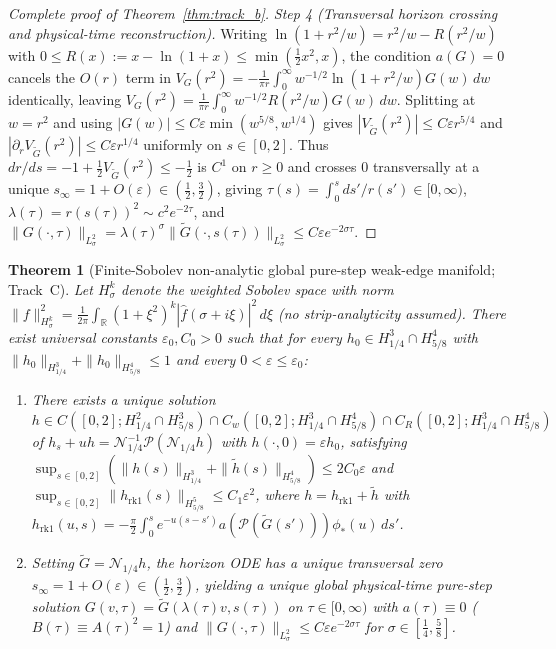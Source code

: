 \documentclass[11pt,a4paper]{article}
\newtheorem{thm}{Theorem}
\begin{document}
\begin{proof}[Complete proof of Theorem~\ref{thm:track_b}]
\emph{Step 4 (Transversal horizon crossing and physical-time reconstruction).}
Writing $\ln(1+r^2/w)=r^2/w-R(r^2/w)$ with $0\le R(x):=x-\ln(1+x)\le\min(\tfrac12 x^2,x)$, the condition $a(G)=0$ cancels the $O(r)$ term in $V_G(r^2)=-\frac{1}{\pi r}\int_0^\infty w^{-1/2}\ln(1+r^2/w)G(w)\,dw$ identically, leaving $V_G(r^2)=\frac{1}{\pi r}\int_0^\infty w^{-1/2}R(r^2/w)G(w)\,dw$.  Splitting at $w=r^2$ and using $|G(w)|\le C\varepsilon\min(w^{5/8},w^{1/4})$ gives $|V_{\widetilde G}(r^2)|\le C\varepsilon r^{5/4}$ and $|\partial_r V_{\widetilde G}(r^2)|\le C\varepsilon r^{1/4}$ uniformly on $s\in[0,2]$.  Thus $dr/ds=-1+\tfrac12 V_{\widetilde G}(r^2)\le-\tfrac12$ is $C^1$ on $r\ge 0$ and crosses $0$ transversally at a unique $s_\infty=1+O(\varepsilon)\in(\tfrac12,\tfrac32)$, giving $\tau(s)=\int_0^s ds'/r(s')\in[0,\infty)$, $\lambda(\tau)=r(s(\tau))^2\sim c^2 e^{-2\tau}$, and $\|G(\cdot,\tau)\|_{L^2_\sigma}=\lambda(\tau)^\sigma\|\widetilde G(\cdot,s(\tau))\|_{L^2_\sigma}\le C\varepsilon e^{-2\sigma\tau}$.
\end{proof}

\begin{thm}[Finite-Sobolev non-analytic global pure-step weak-edge manifold; Track~C]\label{thm:track_c}
Let $H^k_\sigma$ denote the weighted Sobolev space with norm
$\|f\|_{H^k_\sigma}^2=\frac{1}{2\pi}\int_{\mathbb{R}}(1+\xi^2)^k|\widehat f(\sigma+i\xi)|^2\,d\xi$
(no strip-analyticity assumed).  There exist universal constants $\varepsilon_0,C_0>0$ such that for
every $h_0\in H^3_{1/4}\cap H^4_{5/8}$ with $\|h_0\|_{H^3_{1/4}}+\|h_0\|_{H^4_{5/8}}\le 1$ and
every $0<\varepsilon\le\varepsilon_0$:
\begin{enumerate}
\item There exists a unique solution
  $h\in C([0,2];H^2_{1/4}\cap H^3_{5/8})\cap C_w([0,2];H^3_{1/4}\cap H^4_{5/8})\cap C_R([0,2];H^3_{1/4}\cap H^4_{5/8})$
  of $h_s+u h=\mathcal{N}_{1/4}^{-1}\mathcal{P}(\mathcal{N}_{1/4}h)$ with $h(\cdot,0)=\varepsilon h_0$,
  satisfying $\sup_{s\in[0,2]}(\|h(s)\|_{H^3_{1/4}}+\|\tilde h(s)\|_{H^4_{5/8}})\le 2C_0\varepsilon$ and
  $\sup_{s\in[0,2]}\|h_{\mathrm{rk1}}(s)\|_{H^5_{5/8}}\le C_1\varepsilon^2$, where
  $h=h_{\mathrm{rk1}}+\tilde h$ with $h_{\mathrm{rk1}}(u,s)=-\tfrac{\pi}{2}\int_0^s e^{-u(s-s')}a(\mathcal{P}(\widetilde G(s')))\phi_*(u)\,ds'$.
\item Setting $\widetilde G=\mathcal{N}_{1/4}h$, the horizon ODE has a unique transversal zero
  $s_\infty=1+O(\varepsilon)\in(\frac12,\frac32)$, yielding a unique global physical-time pure-step
  solution $G(v,\tau)=\widetilde G(\lambda(\tau)v,s(\tau))$ on $\tau\in[0,\infty)$ with
  $a(\tau)\equiv 0$ ($B(\tau)\equiv A(\tau)^2=1$) and $\|G(\cdot,\tau)\|_{L^2_\sigma}\le C\varepsilon e^{-2\sigma\tau}$
  for $\sigma\in[\tfrac14,\tfrac58]$.
\end{enumerate}
\end{thm}
\end{document}
